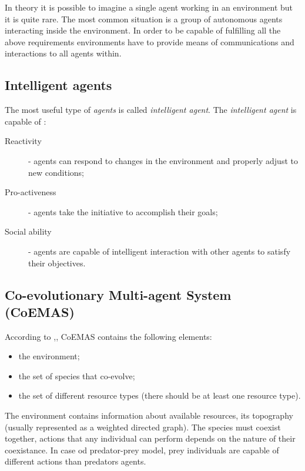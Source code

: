 In theory it is possible to imagine a single agent working in an environment but it is quite rare.
The most common situation is a group of autonomous agents interacting inside the environment.
In order to be capable of fulfilling all the above requirements environments have to provide means of communications and interactions to all agents within.

\subsection{Intelligent agents}

The most useful type of \emph{agents} is called \emph{intelligent agent}.
The \emph{intelligent agent} is capable of \cite{Weiss}:

\begin{description}
  \item [Reactivity]
	  - agents can respond to changes in the environment and properly adjust to new conditions;
  \item [Pro-activeness]
	  - agents take the initiative to accomplish their goals;
  \item [Social ability]
	- agents are capable of intelligent interaction with other agents to satisfy their objectives.
\end{description}

\subsection{Co-evolutionary Multi-agent System (CoEMAS)}
\label{sec:CoEMAS}

According to  \cite{Dre} ,\cite{Dre2}, CoEMAS contains the following elements:

\begin{itemize}
  \item the environment; 
  \item the set of species that co-evolve; 
  \item the set of different resource types (there should be at least one resource type).
\end{itemize}

The environment contains information about available resources, its topography (usually represented as a weighted directed graph).
The species must coexist together, actions that any individual can perform depends on the nature of their coexistance.
In case od predator-prey model, prey individuals are capable of different actions than predators agents.



